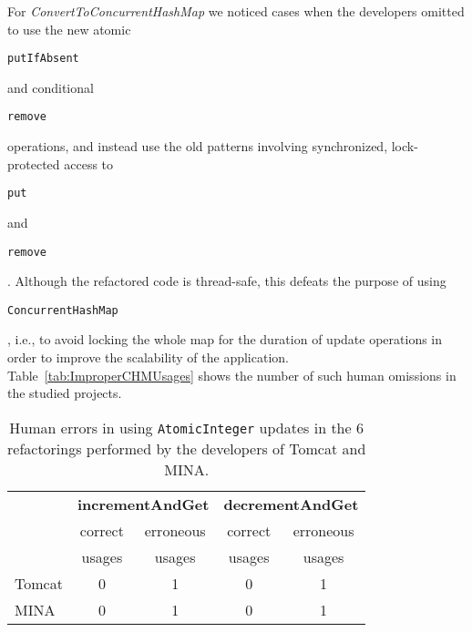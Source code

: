 \documentclass[10pt,preprint]{sigplanconf}
\newcommand\tool{{\smaller\textsc{Concurrencer}}\xspace}
\newcommand{\code}[1]{\begin{small}\texttt{#1}\end{small}}
\begin{document}
 
For \emph{ConvertToConcurrentHashMap} we noticed cases when the developers
omitted to use the new atomic \code{putIfAbsent} and conditional \code{remove}
operations, and instead use the old patterns involving synchronized,
lock-protected access to \code{put} and \code{remove}. Although the
refactored code is thread-safe, this defeats the purpose of using
\code{ConcurrentHashMap}, i.e., to avoid locking the whole map for the 
duration of update operations in order to improve the scalability of the
application. Table~\ref{tab:ImproperCHMUsages} shows the number of such
human omissions in the studied projects.


\begin{table}
\centering
\begin{footnotesize}
\begin{tabular}{l|cc|cc} 
         & \multicolumn{2}{|c|}{\textbf{incrementAndGet}} & \multicolumn{2}{|c}{\textbf{decrementAndGet}} \\ 
         & correct        & erroneous                     & correct        & erroneous                     \\ 
         & usages         &  usages                       & usages         & usages                        \\ \hline
  Tomcat &      0         &        1                      &        0       &     1                         \\
  MINA   &      0         &        1                      &        0       &     1                         \\
\end{tabular}
\caption{Human errors in using \texttt{AtomicInteger} updates in the 6
refactorings performed by the developers of Tomcat and MINA.}
\label{tab:ImproperAIUsages}
\end{footnotesize}
\vspace{-0.2in}
\end{table}
\end{document}

